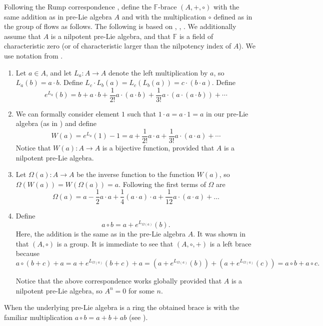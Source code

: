 \documentclass[12pt]{article}
\begin{document}
Following the Rump correspondence \cite{Rump}, define the $\mathbb F$-brace $(A,+, \circ )$ with the same addition as in pre-Lie algebra $A$ and with the multiplication $\circ $ defined  as in the group of flows as follows. The following is based on \cite{AG}, \cite{M}, \cite{Rump}. We additionally assume that $A$ is a nilpotent pre-Lie algebra, and that $\mathbb F$ is a field of characteristic zero (or of characteristic larger than the nilpotency index of $A$). We use notation from \cite{M}.
\begin{enumerate}

\item Let $a\in A$, and let  $L_{a}:A\rightarrow A$ denote the left multiplication by $a$, so
$L_{a}(b)=a\cdot b$.
 Define $L_{c}\cdot L_{b}(a)=L_{c}(L_{b}(a))=c\cdot (b\cdot a)$.
 Define \[e^{L_{a}}(b)=b+a\cdot b+{\frac 1{2!}}a\cdot (a\cdot b)+{\frac 1{3!}}a\cdot (a\cdot (a\cdot b))+\cdots \]

\item  We can formally consider element $1$ such that $1\cdot a=a\cdot 1=a$ in our pre-Lie algebra (as in \cite{M})  and
 define \[W(a)=e^{L_{a}}(1)-1=a+{\frac 1{2!}}a\cdot a+{\frac 1{3!}}a\cdot (a\cdot a)+ \cdots \]
 Notice that $W(a):A\rightarrow A$ is a bijective function, provided that $A$ is a nilpotent pre-Lie algebra.

\item Let $\Omega (a):A\rightarrow A$ be the inverse function to the function $W(a)$, so  $\Omega (W(a))=W(\Omega (a))=a$.
  Following \cite{M} the first terms of $\Omega $ are
{\bf
\[ \Omega (a)=  a-{\frac 12}a\cdot a +{\frac 14} (a\cdot a)\cdot a +{\frac {1}{12}}a\cdot (a\cdot a) +\ldots \]
}

\item Define\[a\circ b=a+e^{L_{\Omega (a)}}(b).\]
 Here, the addition is the same as in the pre-Lie algebra $A$.
It was shown in \cite{AG}  that $(A, \circ )$ is a group. It is immediate to see that $(A, \circ , + )$ is a left brace because
 \[a\circ (b+c)+a=a+e^{L_{\Omega (a)}}(b+c)+a=(a+e^{L_{\Omega (a)}}(b))+(a+e^{L_{\Omega (a)}}(c))=a\circ b+a\circ c.\]

Notice that the above correspondence works globally provided that $A$ is a nilpotent pre-Lie algebra, so  $A^{n}=0$
 for some $n$.


\end{enumerate}


When the underlying pre-Lie algebra is a ring the obtained brace is with the  familiar  multiplication
 $a\circ b=a+b+ab$  (see \cite{M}).
\end{document}
